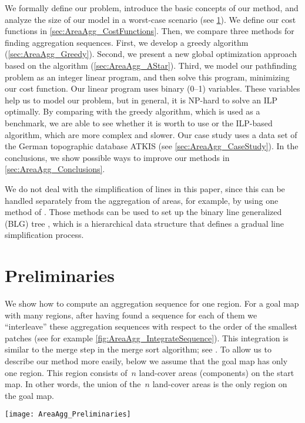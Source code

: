 We formally define our problem, 
introduce the basic concepts of our method, 
and analyze the size of our model in a worst-case scenario
(see \sect\ref{sec:AreaAgg_Preliminaries}).
We define our cost functions in 
\sect\ref{sec:AreaAgg_CostFunctions}.
Then, we compare three methods for finding aggregation sequences.
First, we develop 
a greedy algorithm (\sect\ref{sec:AreaAgg_Greedy}).
Second, we present a new global optimization approach
based on the \Astar algorithm 
(\sect\ref{sec:AreaAgg_AStar}).
Third, we model our pathfinding problem as
an integer linear program, 
and then solve this program, minimizing our cost function.
Our linear program uses binary (0--1) variables. 
These variables help us to model our problem, 
but in general, it is NP-hard to solve an ILP optimally.
By comparing with the greedy algorithm, 
which is used as a benchmark,
we are able to see whether it is worth 
to use \Astar or the ILP-based algorithm, 
which are more complex and slower.  
Our case study 
uses a data set of the German topographic database ATKIS 
(see \sect\ref{sec:AreaAgg_CaseStudy}).
In the conclusions, we show possible ways to improve our 
methods in \sect\ref{sec:AreaAgg_Conclusions}. 

We do not deal with the simplification of lines in this paper, 
since this can be handled separately from the
aggregation of areas, for example, 
by using one method of 
\textcite{Douglas1973,Saalfeld1999,Wu2004DP}.
Those methods can be used to set up 
the binary line generalized (BLG) tree
\citep{vanOosterom1995Development},
which is a hierarchical data structure that 
defines a gradual line simplification process.

\section{Preliminaries}
\label{sec:AreaAgg_Preliminaries}

We show how to compute an aggregation sequence for one region. 
For a goal map with many regions, 
after having found a sequence for each of them
we ``interleave'' these aggregation sequences
with respect to the order of the smallest patches 
(see for example \fig\ref{fig:AreaAgg_IntegrateSequence}).
This integration is similar to the merge step in the 
merge sort algorithm; 
see \textcite[pp.~29--37]{Cormen2009}.
To allow us to describe our method more easily,
below we assume that the goal map has only one region.
This region consists of~$n$ land-cover 
areas (components) on the start map. 
In other words, the union of the~$n$ land-cover areas 
is the only region on the goal map.
\begin{figure*}[tb]
\centering
\texttt{[image: AreaAgg\_Preliminaries]}
\caption{Integrating two aggregation sequences 
	of different regions: 
	the resulting sequence contains the given sequences 
	as subsequences and 
	always takes the subdivision with smallest patch next.
	The gray arrows show the integration of the two regions.
}
\label{fig:AreaAgg_IntegrateSequence}
\end{figure*}


